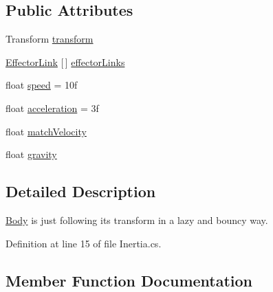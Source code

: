 \subsection*{Public Attributes}
\begin{DoxyCompactItemize}
\item 
Transform \mbox{\hyperlink{class_root_motion_1_1_final_i_k_1_1_inertia_1_1_body_a091d2f617b503e98752f8da42b4331b1}{transform}}
\item 
\mbox{\hyperlink{class_root_motion_1_1_final_i_k_1_1_inertia_1_1_body_1_1_effector_link}{Effector\+Link}} \mbox{[}$\,$\mbox{]} \mbox{\hyperlink{class_root_motion_1_1_final_i_k_1_1_inertia_1_1_body_a003d4260f0c55128c2f4883b934c0f4f}{effector\+Links}}
\item 
float \mbox{\hyperlink{class_root_motion_1_1_final_i_k_1_1_inertia_1_1_body_a6c85a65f736e7006a4be07b29315022b}{speed}} = 10f
\item 
float \mbox{\hyperlink{class_root_motion_1_1_final_i_k_1_1_inertia_1_1_body_a1246408c23da6f4cd2661600e2296f12}{acceleration}} = 3f
\item 
float \mbox{\hyperlink{class_root_motion_1_1_final_i_k_1_1_inertia_1_1_body_a691db5d3e9a7941d864dc24289c8edd3}{match\+Velocity}}
\item 
float \mbox{\hyperlink{class_root_motion_1_1_final_i_k_1_1_inertia_1_1_body_a382d01159b6285e7aaee7085031ccb21}{gravity}}
\end{DoxyCompactItemize}


\subsection{Detailed Description}
\mbox{\hyperlink{class_root_motion_1_1_final_i_k_1_1_inertia_1_1_body}{Body}} is just following it\textquotesingle{}s transform in a lazy and bouncy way. 



Definition at line 15 of file Inertia.\+cs.



\subsection{Member Function Documentation}
\mbox{\label{class_root_motion_1_1_final_i_k_1_1_inertia_1_1_body_a801423a6f567439c5d3d8e133f6c7bb6}} 
